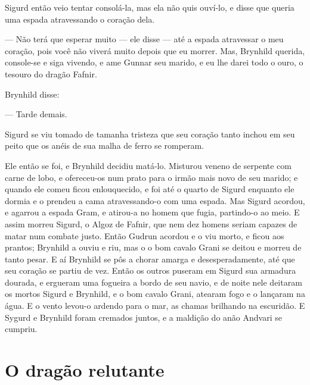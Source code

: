 Sigurd então veio tentar consolá-la, mas ela não quis ouví-lo, e disse
que queria uma espada atravessando o coração dela. 

— Não terá que esperar muito — ele disse — até a espada atravessar o
meu coração, pois você não viverá muito depois que eu morrer. Mas,
Brynhild querida, console-se e siga vivendo, e ame Gunnar seu marido,
e eu lhe darei todo o ouro, o tesouro do dragão Fafnir. 

Brynhild disse:

— Tarde demais.

Sigurd se viu tomado de tamanha tristeza que seu coração tanto inchou
em seu peito que os anéis de sua malha de ferro se romperam.

Ele então se foi, e Brynhild decidiu matá-lo. Misturou veneno de
serpente com carne de lobo, e ofereceu-os num prato para o irmão mais
novo de seu marido; e quando ele comeu ficou enlouquecido, e foi até
o quarto de Sigurd enquanto ele dormia e o prendeu a cama
atravessando-o com uma espada. Mas Sigurd acordou, e agarrou a espada
Gram, e atirou-a no homem que fugia, partindo-o ao meio. E assim
morreu Sigurd, o Algoz de Fafnir, que nem dez homens seriam capazes
de matar num combate justo. Então Gudrun acordou e o viu morto, e
ficou aos prantos; Brynhild a ouviu e riu, mas o o bom cavalo Grani
se deitou e morreu de tanto pesar. E aí Brynhild se pôs a chorar
amarga e desesperadamente, até que seu coração se partiu de vez.
Então os outros puseram em Sigurd sua armadura dourada, e ergueram
uma fogueira a bordo de seu navio, e de noite nele deitaram os mortos
Sigurd e Brynhild, e o bom cavalo Grani, atearam fogo e o lançaram na
água. E o vento levou-o ardendo para o mar, as chamas brilhando na
escuridão. E Sygurd e Brynhild foram cremados juntos, e a maldição do
anão Andvari se cumpriu.

\chapter{O dragão relutante}

